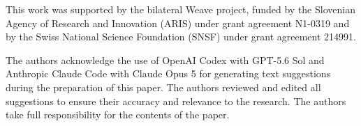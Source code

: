 \documentclass[sigconf,natbib=false,language=english]{acmart}
\begin{document}






\begin{acks}
This work was supported by the bilateral Weave project, funded by
the Slovenian Agency of Research and Innovation (ARIS) under
grant agreement N1-0319 and by the Swiss National Science
Foundation (SNSF) under grant agreement 214991.

The authors acknowledge the use of OpenAI Codex with GPT-5.6 Sol and Anthropic Claude Code with Claude Opus 5 for generating text suggestions during the preparation of this paper.
The authors reviewed and edited all suggestions to ensure their accuracy and relevance to the research.
The authors take full responsibility for the contents of the paper.

\end{acks}

\printbibliography
\end{document}
